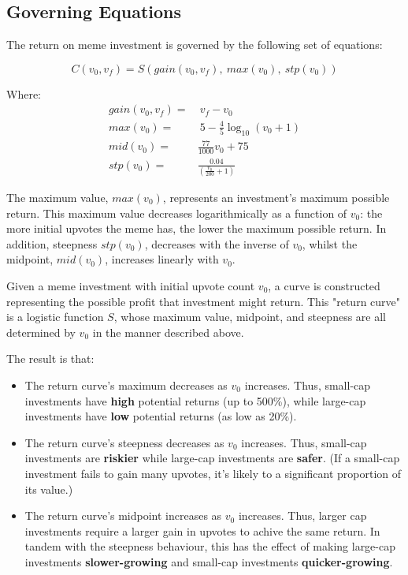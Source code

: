 \documentclass[a4paper, 12pt]{article}
\begin{document}
\subsection*{Governing Equations}
\label{sec:orga835eb0}

The return on meme investment is governed by the following set of equations:

\begin{equation*}
C(v_0, v_f) = S(gain(v_0, v_f),\ max(v_0),\ stp(v_0))
\end{equation*}

Where:
\begin{align*}
gain(v_0, v_f) =& \ v_f - v_0\\
max(v_0) =& \ 5 - \frac{4}{5} \log_{10}(v_0 + 1)\\
mid(v_0) =& \frac{77}{1000}v_0 + 75 \\
stp(v_0) =& \frac{0.04}{\left( \frac{v_0}{200} + 1 \right)}  
\end{align*}

The maximum value, \(max(v_0)\), represents an investment's maximum possible return. This maximum 
value decreases logarithmically as a function of \(v_0\): the more initial upvotes the meme has, the lower 
the maximum possible return. In addition, steepness \(stp(v_0)\), decreases with the inverse of \(v_0\), 
whilst the midpoint, \(mid(v_0)\), increases linearly with \(v_0\). 

Given a meme investment with initial upvote count \(v_0\), a curve is constructed representing
the possible profit that investment might return. This "return curve" is a logistic function
\(S\), whose maximum value, midpoint, and steepness are all determined by \(v_0\) in
the manner described above. 

The result is that:

\begin{itemize}
\item The return curve's maximum decreases as \(v_0\) increases. Thus, small-cap
investments have \textbf{high} potential returns (up to 500\%), while large-cap
investments have \textbf{low} potential returns (as low as 20\%).

\item The return curve's steepness decreases as \(v_0\) increases. Thus, small-cap
investments are \textbf{riskier} while large-cap investments are \textbf{safer}. (If a
small-cap investment fails to gain many upvotes, it's likely to a significant
proportion of its value.)

\item The return curve's midpoint increases as \(v_0\) increases. Thus, larger cap
investments require a larger gain in upvotes to achive the same return. In
tandem with the steepness behaviour, this has the effect of making large-cap
investments \textbf{slower-growing} and small-cap investments \textbf{quicker-growing}.
\end{itemize}
\end{document}
